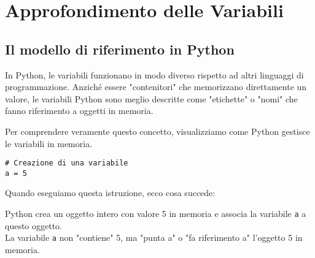 \clearpage

\section{Approfondimento delle Variabili}\label{variabiliMemoria}

\subsection{Il modello di riferimento in Python}

In Python, le variabili funzionano in modo diverso rispetto ad altri linguaggi di programmazione. Anziché essere "contenitori" che memorizzano direttamente un valore, le variabili Python sono meglio descritte come "etichette" o "nomi" che fanno riferimento a oggetti in memoria.

Per comprendere veramente questo concetto, visualizziamo come Python gestisce le variabili in memoria.

\begin{lstlisting}
# Creazione di una variabile
a = 5
\end{lstlisting}

Quando eseguiamo questa istruzione, ecco cosa succede:

\begin{center}
\end{center}

Python crea un oggetto intero con valore 5 in memoria e associa la variabile \texttt{a} a questo oggetto.\\ La variabile \texttt{a} non "contiene" 5, ma "punta a" o "fa riferimento a" l'oggetto 5 in memoria.

